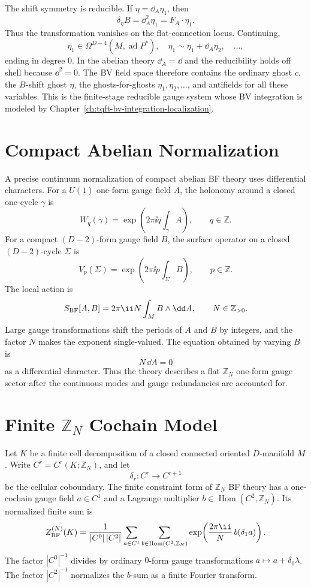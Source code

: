 The shift symmetry is reducible.  If
\(\eta=\dd_A\eta_1\), then
\[
  \delta_\eta B=\dd_A^2\eta_1=F_A\cdot\eta_1 .
\]
Thus the transformation vanishes on the flat-connection locus.  Continuing,
\[
  \eta_1\in\Omega^{D-4}(M,\operatorname{ad}P^*),
  \quad
  \eta_1\sim\eta_1+\dd_A\eta_2,
  \quad
  \ldots ,
\]
ending in degree \(0\).  In the abelian theory \(\dd_A=\dd\) and the
reducibility holds off shell because \(\dd^2=0\).  The BV field space
therefore contains the ordinary ghost \(c\), the \(B\)-shift ghost
\(\eta\), the ghosts-for-ghosts \(\eta_1,\eta_2,\ldots\), and antifields for
all these variables.  This is the finite-stage reducible gauge system whose
BV integration is modeled by Chapter~\ref{ch:tqft-bv-integration-localization}.

\section{Compact Abelian Normalization}

A precise continuum normalization of compact abelian BF theory uses
differential characters.  For a \(U(1)\) one-form gauge field \(A\), the
holonomy around a closed one-cycle \(\gamma\) is
\[
  W_q(\gamma)=
  \exp\!\left(2\pi\ii q\int_\gamma A\right),
  \qquad q\in\mathbb Z .
\]
For a compact \((D-2)\)-form gauge field \(B\), the surface operator on a
closed \((D-2)\)-cycle \(\Sigma\) is
\[
  V_p(\Sigma)=
  \exp\!\left(2\pi\ii p\int_\Sigma B\right),
  \qquad p\in\mathbb Z .
\]
The local action is
\[
  S_{\rm BF}[A,B]=2\pi\ii N\int_M B\wedge\dd A ,
  \qquad N\in\mathbb Z_{>0}.
\]
Large gauge transformations shift the periods of \(A\) and \(B\) by
integers, and the factor \(N\) makes the exponent single-valued.  The
equation obtained by varying \(B\) is
\[
  N\,\dd A=0
\]
as a differential character.  Thus the theory describes a flat
\(\mathbb Z_N\) one-form gauge sector after the continuous modes and gauge
redundancies are accounted for.

\section{Finite \texorpdfstring{\(\mathbb Z_N\)}{ZN} Cochain Model}
\label{sec:finite-zn-bf-cochain-model}

Let \(K\) be a finite cell decomposition of a closed connected oriented
\(D\)-manifold \(M\).  Write \(C^r=C^r(K;\mathbb Z_N)\), and let
\[
  \delta_r:C^r\longrightarrow C^{r+1}
\]
be the cellular coboundary.  The finite constraint form of \(\mathbb Z_N\)
BF theory has a one-cochain gauge field \(a\in C^1\) and a Lagrange
multiplier \(b\in\operatorname{Hom}(C^2,\mathbb Z_N)\).  Its normalized
finite sum is
\begin{equation}
  Z_{\rm BF}^{(N)}(K)
  =
  \frac{1}{|C^0|\,|C^2|}
  \sum_{a\in C^1}\sum_{b\in\operatorname{Hom}(C^2,\mathbb Z_N)}
  \exp\!\left(\frac{2\pi\ii}{N}\,b(\delta_1a)\right).
  \label{eq:finite-bf-cochain-partition}
\end{equation}
The factor \(|C^0|^{-1}\) divides by ordinary \(0\)-form gauge
transformations \(a\mapsto a+\delta_0\lambda\).  The factor \(|C^2|^{-1}\)
normalizes the \(b\)-sum as a finite Fourier transform.

